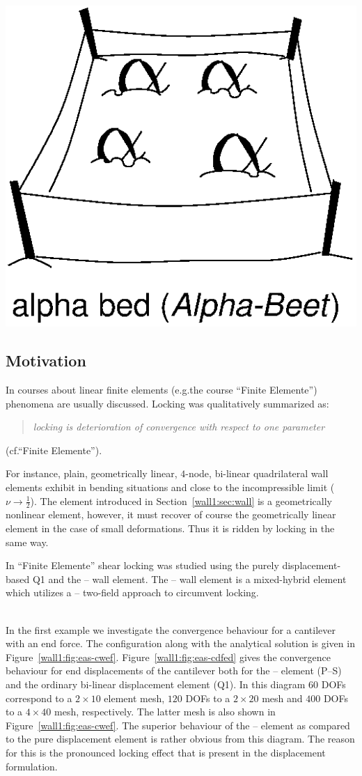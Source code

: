 \begin{flushright}
  \includegraphics[width=0.2\linewidth]{eps/eas-alphabed}
\end{flushright}

\subsection{Motivation}
In courses about linear finite elements (e.g.\@ the course ``Finite
Elemente'')  phenomena are usually discussed. Locking was
qualitatively summarized as:
\begin{quote}
 \emph{locking is deterioration of convergence with respect to
one parameter}
\end{quote} (cf.\@ ``Finite Elemente''). 

For instance, plain, geometrically linear, $4$-node, bi-linear quadrilateral
wall elements 
exhibit  in bending situations and  
close to the incompressible limit ($\nu\to\frac{1}{2}$). The element
introduced in Section~\ref{wall1:sec:wall} is a geometrically nonlinear element, however, it must
recover of course the geometrically linear element in the case of small
deformations. Thus it is ridden by locking in the same way. 

In ``Finite Elemente'' shear locking was studied using the purely
displacement-based Q1 and the -- wall element. The
-- wall element is a mixed-hybrid element which
utilizes a -- two-field approach to circumvent
locking. 

\\
In the first example we investigate the convergence behaviour for a cantilever
with an end force. The configuration along with the analytical solution is
given in Figure~\ref{wall1:fig:eas-cwef}\@. Figure~\ref{wall1:fig:eas-cdfed} gives the
convergence behaviour for 
end displacements of the cantilever both for the --
element (P--S) and 
the ordinary bi-linear displacement element (Q1).  In this diagram $60$ DOFs
correspond to a $2\times10$ element mesh, $120$ DOFs to a $2\times20$ mesh and
$400$  DOFs to a 
$4\times40$ mesh, respectively. The latter mesh is also shown in
Figure~\ref{wall1:fig:eas-cwef}. The superior behaviour of the
-- element as 
compared to the pure displacement element is rather obvious from this
diagram. The reason for this is the pronounced locking effect that is present
in the displacement formulation.

